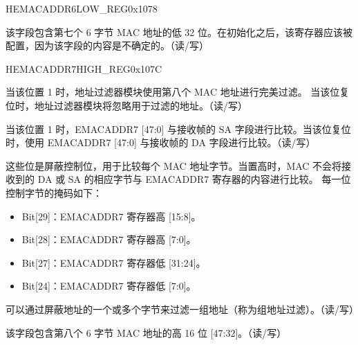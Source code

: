 \begin{register}{H}{EMACADDR6LOW\_REG}{0x1078}\label{regdesc:EMACADDR6LOWREG}
%
\regnewline%
\begin{regdesc}\begin{reglist}
\item [EMACADDR6LOW\_REG]该字段包含第七个 6 字节 MAC 地址的低 32 位。在初始化之后，该寄存器应该被配置，因为该字段的内容是不确定的。（读/写）
\end{reglist}\end{regdesc}
\end{register}


\begin{register}{H}{EMACADDR7HIGH\_REG}{0x107C}\label{regdesc:EMACADDR7HIGHREG}
%
%
%
%
%
\regnewline%
\begin{regdesc}\begin{reglist}
\item [ADDRESS\_ENABLE7]当该位置 1 时，地址过滤器模块使用第八个 MAC 地址进行完美过滤。 当该位复位时，地址过滤器模块将忽略用于过滤的地址。（读/写）
\item [SOURCE\_ADDRESS7]当该位置 1 时，EMACADDR7 [47:0] 与接收帧的 SA 字段进行比较。当该位复位时，使用 EMACADDR7 [47:0] 与接收帧的 DA 字段进行比较。（读/写）
\item [MASK\_BYTE\_CONTROL7] 这些位是屏蔽控制位，用于比较每个 MAC 地址字节。当置高时，MAC 不会将接收到的 DA 或 SA 的相应字节与 EMACADDR7 寄存器的内容进行比较。 每一位控制字节的掩码如下：
\begin{itemize}
\item Bit[29]：EMACADDR7 寄存器高 [15:8]。\item Bit[28]：EMACADDR7 寄存器高 [7:0]。\item Bit[27]：EMACADDR7 寄存器低 [31:24]。\item Bit[24]：EMACADDR7 寄存器低 [7:0]。\end{itemize}
可以通过屏蔽地址的一个或多个字节来过滤一组地址（称为组地址过滤）。（读/写）
\item [MAC\_ADDRESS7\_HI] 该字段包含第八个 6 字节 MAC 地址的高 16 位 [47:32]。（读/写）
\end{reglist}\end{regdesc}
\end{register}

